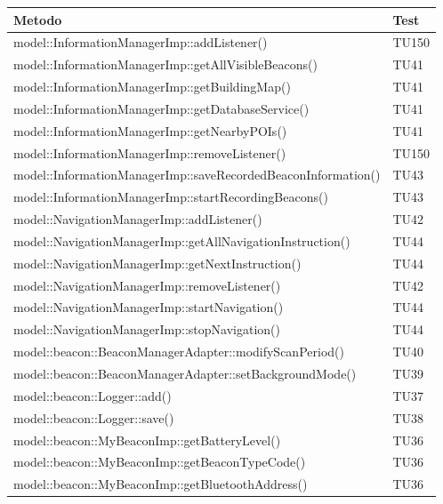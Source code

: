 \documentclass[../DefinizioneDiProdotto.tex]{subfiles}
\begin{document}
\begin{longtabu}to \textwidth{X[3.5] X[0.3]}
	\toprule
	\textbf{Metodo} & \textbf{Test}\\
	\midrule
	\endhead
	model::\-InformationManagerImp::\-addListener() & TU150 \\ 
	\midrule 
	model::\-InformationManagerImp::\-getAllVisibleBeacons() & TU41 \\ 
	\midrule 
	model::\-InformationManagerImp::\-getBuildingMap() & TU41 \\ 
	\midrule 
	model::\-InformationManagerImp::\-getDatabaseService() & TU41 \\ 
	\midrule 
	model::\-InformationManagerImp::\-getNearbyPOIs() & TU41 \\ 
	\midrule 
	model::\-InformationManagerImp::\-removeListener() & TU150 \\ 
	\midrule 
	model::\-InformationManagerImp::\-saveRecordedBeaconInformation() & TU43 \\ 
	\midrule 
	model::\-InformationManagerImp::\-startRecordingBeacons() & TU43 \\ 
	\midrule 
	model::\-NavigationManagerImp::\-addListener() & TU42 \\ 
	\midrule 
	model::\-NavigationManagerImp::\-getAllNavigationInstruction() & TU44 \\ 
	\midrule 
	model::\-NavigationManagerImp::\-getNextInstruction() & TU44 \\ 
	\midrule 
	model::\-NavigationManagerImp::\-removeListener() & TU42 \\ 
	\midrule 
	model::\-NavigationManagerImp::\-startNavigation() & TU44 \\ 
	\midrule 
	model::\-NavigationManagerImp::\-stopNavigation() & TU44 \\ 
	\midrule 
	model::\-beacon::\-BeaconManagerAdapter::\-modifyScanPeriod() & TU40 \\ 
	\midrule 
	model::\-beacon::\-BeaconManagerAdapter::\-setBackgroundMode() & TU39 \\ 
	\midrule 
	model::\-beacon::\-Logger::\-add() & TU37 \\ 
	\midrule 
	model::\-beacon::\-Logger::\-save() & TU38 \\ 
	\midrule 
	model::\-beacon::\-MyBeaconImp::\-getBatteryLevel() & TU36 \\ 
	\midrule 
	model::\-beacon::\-MyBeaconImp::\-getBeaconTypeCode() & TU36 \\ 
	\midrule 
	model::\-beacon::\-MyBeaconImp::\-getBluetoothAddress() & TU36 \\ 

\end{longtabu}
\end{document}
